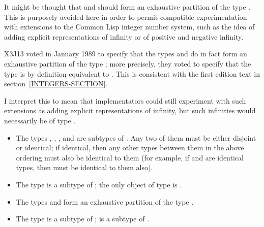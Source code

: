 {\begin{obsolete}
\beforenoterule
\begin{rationale}
It might be thought that  and  should
form an exhaustive partition of the type .  This is purposely
avoided here in order to permit compatible experimentation with
extensions to the Common Lisp integer number system, such as the idea of
adding explicit representations of infinity or of positive and negative
infinity.
\end{rationale}
\afternoterule
\end{obsolete}

\begin{new}
X3J13 voted in January 1989
to specify that the types  and 
do in fact form an exhaustive partition of the type ; more precisely,
they voted to specify that the type  is by definition equivalent
to .  This is consistent with the
first edition text in section~\ref{INTEGERS-SECTION}.

I interpret this to mean that implementators could still experiment with
such extensions as adding explicit representations of infinity, but such infinities
would necessarily be of type .
\end{new}

\begin{itemize}
\item
The types , , , and
 are subtypes of .  Any two of them must be
either disjoint or identical; if identical, then any other types between
them in the above ordering must also be identical to them
(for example, if  and  are identical types,
then  must be identical to them also).

\item
The type  is a subtype of ; the only object of type
 is {\nil}.

\item
The types  and  form an exhaustive partition of the type
.
\end{itemize}

\begin{obsolete}
\begin{itemize}
\item
The type  is a subtype of ;
 is a subtype of .
\end{itemize}
\end{obsolete}


}
